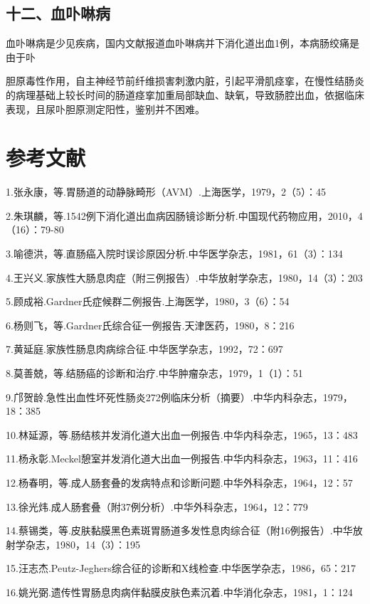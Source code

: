 \subsection{十二、血卟啉病}

血卟啉病是少见疾病，国内文献报道血卟啉病并下消化道出血1例，本病肠绞痛是由于卟

胆原毒性作用，自主神经节前纤维损害刺激内脏，引起平滑肌痉挛，在慢性结肠炎的病理基础上较长时间的肠道痉挛加重局部缺血、缺氧，导致肠腔出血，依据临床表现，且尿卟胆原测定阳性，鉴别并不困难。

\protect\hypertarget{text00181.html}{}{}

\section{参考文献}

1.张永康，等.胃肠道的动静脉畸形（AVM）.上海医学，1979，2（5）：45

2.朱琪麟，等.1542例下消化道出血病因肠镜诊断分析.中国现代药物应用，2010，4（16）：79-80

3.喻德洪，等.直肠癌入院时误诊原因分析.中华医学杂志，1981，61（3）：134

4.王兴义.家族性大肠息肉症（附三例报告）.中华放射学杂志，1980，14（3）：203

5.顾成裕.Gardner氏症候群二例报告.上海医学，1980，3（6）：54

6.杨则飞，等.Gardner氏综合征一例报告.天津医药，1980，8：216

7.黄延庭.家族性肠息肉病综合征.中华医学杂志，1992，72：697

8.莫善兢，等.结肠癌的诊断和治疗.中华肿瘤杂志，1979，1（1）：51

9.邝贺龄.急性出血性坏死性肠炎272例临床分析（摘要）.中华内科杂志，1979，18：385

10.林延源，等.肠结核并发消化道大出血一例报告.中华内科杂志，1965，13：483

11.杨永彰.Meckel憩室并发消化道大出血一例报告.中华内科杂志，1963，11：416

12.杨春明，等.成人肠套叠的发病特点和诊断问题.中华外科杂志，1964，12：57

13.徐光炜.成人肠套叠（附37例分析）.中华外科杂志，1964，12：779

14.蔡锡类，等.皮肤黏膜黑色素斑胃肠道多发性息肉综合征（附16例报告）.中华放射学杂志，1980，14（3）：195

15.汪志杰.Peutz-Jeghers综合征的诊断和X线检查.中华医学杂志，1986，65：217

16.姚光弼.遗传性胃肠息肉病伴黏膜皮肤色素沉着.中华消化杂志，1981，1：124

